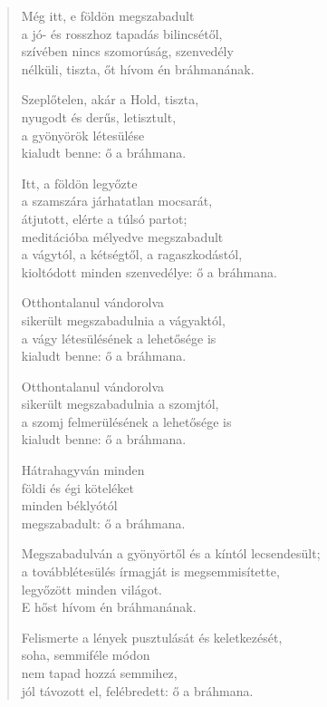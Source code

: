 \begin{verse}
 Még itt, e földön megszabadult\\
a jó- és rosszhoz tapadás bilincsétől,\\
szívében nincs szomorúság, szenvedély\\
nélküli, tiszta, őt hívom én bráhmanának.

 Szeplőtelen, akár a Hold, tiszta,\\
nyugodt és derűs, letisztult,\\
a gyönyörök létesülése\\
kialudt benne: ő a bráhmana.

 Itt, a földön legyőzte\\
a szamszára járhatatlan mocsarát,\\
átjutott, elérte a túlsó partot;\\
meditációba mélyedve megszabadult\\
a vágytól, a kétségtől, a ragaszkodástól,\\
kioltódott minden szenvedélye: ő a bráhmana.

 Otthontalanul vándorolva\\
sikerült megszabadulnia a vágyaktól,\\
a vágy létesülésének a lehetősége is\\
kialudt benne: ő a bráhmana.

 Otthontalanul vándorolva\\
sikerült megszabadulnia a szomjtól,\\
a szomj felmerülésének a lehetősége is\\
kialudt benne: ő a bráhmana.

 Hátrahagyván minden\\
földi és égi köteléket\\
minden béklyótól\\
megszabadult: ő a bráhmana.

 Megszabadulván a gyönyörtől és a kíntól lecsendesült;\\
a továbblétesülés írmagját is megsemmisítette,\\
legyőzött minden világot.\\
E hőst hívom én bráhmanának.

 Felismerte a lények pusztulását és keletkezését,\\
soha, semmiféle módon\\
nem tapad hozzá semmihez,\\
jól távozott el, felébredett: ő a bráhmana.


\end{verse}
